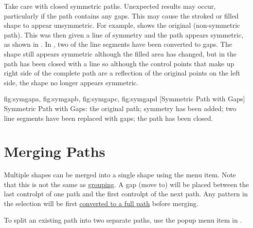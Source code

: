 \begin{warning}
Take care with closed symmetric paths. Unexpected results
may occur, particularly if the path contains any gaps. This may
cause the stroked or filled shape to appear unsymmetric.
For example,  shows the original
(non-symmetric path). This was then given a line of symmetry and
the path appears symmetric, as shown in . In
, two of the line segments have been
converted to gaps. The shape still appears symmetric although the
filled area has changed, but in  the path
has been closed with a line so although the control points that
make up right side of the complete path are a reflection of the
original points on the left side, the shape no longer appears
symmetric.
\end{warning}

{
  {fig:symgapa}{}{},
  {fig:symgapb}{}{},
  {fig:symgapc}{}{},
  {fig:symgapd}{}{}
}
[Symmetric Path with Gaps]
{Symmetric Path with Gaps:
 the original path;
 symmetry has been added;
 two line segments have been replaced with gaps;
 the path has been closed.}


\section{Merging Paths}\label{sec:mergepaths}


Multiple \glspl{shape} can be merged into a single \gls*{shape}
using the  menu item. Note that this is not
the same as \hyperref[sec:grouping]{grouping}.  A \gls{gap} (move
to) will be placed between the last \gls{controlpt} of one path and
the first \gls*{controlpt} of the next path. Any \gls{pattern} in
the selection will be first \hyperref[sec:converttopath]{converted
to a full path} before merging.

\begin{information}
To split an existing \gls{path} into two separate \glspl{path}, use the
 popup menu item in \editpathmode.
\end{information}

